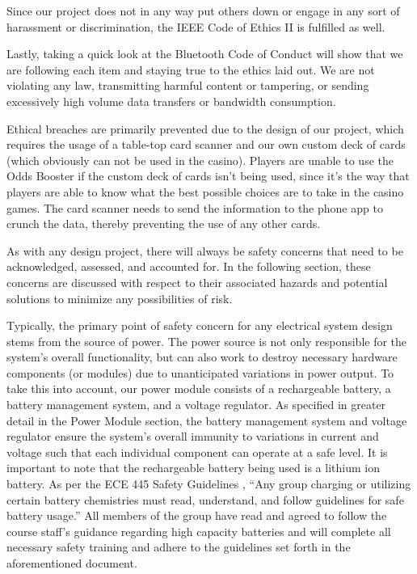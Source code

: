 \documentclass[12pt]{article}
\begin{document}
Since our project does not in any way put others down or engage in any sort of harassment or discrimination, the IEEE Code of Ethics II \cite{IEEE_ethics} is fulfilled as well. 

Lastly, taking a quick look at the Bluetooth Code of Conduct \cite{BT_conduct} will show that we are following each item and staying true to the ethics laid out. We are not violating any law, transmitting harmful content or tampering, or sending excessively high volume data transfers or bandwidth consumption.

Ethical breaches are primarily prevented due to the design of our project, which requires the usage of a table-top card scanner and our own custom deck of cards (which obviously can not be used in the casino). Players are unable to use the Odds Booster if the custom deck of cards isn't being used, since it's the way that players are able to know what the best possible choices are to take in the casino games. The card scanner needs to send the information to the phone app to crunch the data, thereby preventing the use of any other cards. 

As with any design project, there will always be safety concerns that need to be acknowledged, assessed, and accounted for. In the following section, these concerns are discussed with respect to their associated hazards and potential solutions to minimize any possibilities of risk.

Typically, the primary point of safety concern for any electrical system design stems from the source of power. The power source is not only responsible for the system's overall functionality, but can also work to destroy necessary hardware components (or modules) due to unanticipated variations in power output. To take this into account, our power module consists of a rechargeable battery, a battery management system, and a voltage regulator. As specified in greater detail in the Power Module section, the battery management system and voltage regulator ensure the system's overall immunity to variations in current and voltage such that each individual component can operate at a safe level. It is important to note that the rechargeable battery being used is a lithium ion battery. As per the ECE 445 Safety Guidelines \cite{445_safety}, ``Any group charging or utilizing certain battery chemistries must read, understand, and follow guidelines for safe battery usage.'' All members of the group have read and agreed to follow the course staff's guidance regarding high capacity batteries \cite{Li_safety} and will complete all necessary safety training and adhere to the guidelines set forth in the aforementioned document. 
\end{document}
